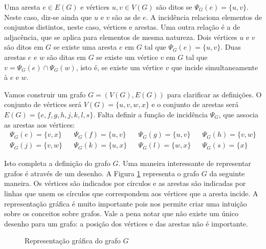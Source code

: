 Uma aresta $e \in E(G)$ e vértices $u, v \in V(G)$ são ditos  se $\Psi_G(e) = \{u,v\}$. Neste caso, diz-se ainda que $u$ e $v$ são as  de $e$. A incidência relaciona elementos de conjuntos distintos, neste caso, vértices e arestas.
Uma outra relação é a de adjacência, que se aplica para elementos de mesma natureza. Dois vértices $u$ e $v$ são ditos  em $G$ se existe uma aresta $e$ em $G$ tal que $\Psi_G(e) = \{u,v\}$. Duas arestas $e$ e $w$ são ditas  em $G$ se existe um vértice $v$ em $G$ tal que $v = \Psi_G(e) \cap \Psi_G(w)$, isto é, se existe um vértice $v$ que incide simultaneamente à $e$ e $w$.

Vamos construir um grafo $G = (V(G), E(G))$ para clarificar as definições. O conjunto de vértices será $V(G) = \{u,v,w,x\}$ e o conjunto de arestas será $E(G) = \{e, f, g, h, j, k, l, s\}$. Falta definir a função de incidência $\Psi_G$, que associa as arestas aos vértices:
\begin{align*}
\Psi_G(e) = \{v,x\} & &
\Psi_G(f) = \{u,v\} & &
\Psi_G(g) = \{u,v\} & &
\Psi_G(h) = \{v,w\} \\
\Psi_G(j) = \{v,w\} & &
\Psi_G(k) = \{u,x\} & &
\Psi_G(l) = \{w,x\} & &
\Psi_G(s) = \{x\}
\end{align*}

Isto completa a definição do grafo $G$. Uma maneira interessante de representar grafos é através de um desenho. A Figura \ref{fig:grafo} representa o grafo $G$ da seguinte maneira. Os vértices são indicados por círculos e as arestas são indicadas por linhas que unem os círculos que correspondem aos vértices que a aresta incide. A representação gráfica é muito importante pois nos permite criar uma intuição sobre os conceitos sobre grafos. Vale a pena notar que não existe um único desenho para um grafo: a posição dos vértices e das arestas não é importante.

\begin{figure}[h!]
\centering
{}
\caption{Representação gráfica do grafo $G$}
\label{fig:grafo}
\end{figure}


